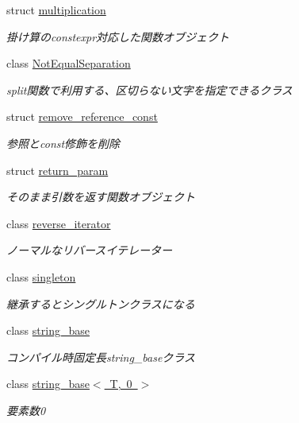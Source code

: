 \begin{DoxyCompactItemize}
struct \mbox{\hyperlink{structsaki_1_1multiplication}{multiplication}}
\begin{DoxyCompactList}\small\item\em 掛け算のconstexpr対応した関数オブジェクト \end{DoxyCompactList}\item 
class \mbox{\hyperlink{classsaki_1_1_not_equal_separation}{Not\+Equal\+Separation}}
\begin{DoxyCompactList}\small\item\em split関数で利用する、区切らない文字を指定できるクラス \end{DoxyCompactList}\item 
struct \mbox{\hyperlink{structsaki_1_1remove__reference__const}{remove\+\_\+reference\+\_\+const}}
\begin{DoxyCompactList}\small\item\em 参照とconst修飾を削除 \end{DoxyCompactList}\item 
struct \mbox{\hyperlink{structsaki_1_1return__param}{return\+\_\+param}}
\begin{DoxyCompactList}\small\item\em そのまま引数を返す関数オブジェクト \end{DoxyCompactList}\item 
class \mbox{\hyperlink{classsaki_1_1reverse__iterator}{reverse\+\_\+iterator}}
\begin{DoxyCompactList}\small\item\em ノーマルなリバースイテレーター \end{DoxyCompactList}\item 
class \mbox{\hyperlink{classsaki_1_1singleton}{singleton}}
\begin{DoxyCompactList}\small\item\em 継承するとシングルトンクラスになる \end{DoxyCompactList}\item 
class \mbox{\hyperlink{classsaki_1_1string__base}{string\+\_\+base}}
\begin{DoxyCompactList}\small\item\em コンパイル時固定長string\+\_\+baseクラス \end{DoxyCompactList}\item 
class \mbox{\hyperlink{classsaki_1_1string__base_3_01_t_00_010_01_4}{string\+\_\+base$<$ T, 0 $>$}}
\begin{DoxyCompactList}\small\item\em 要素数0 \end{DoxyCompactList}\item 

\end{DoxyCompactItemize}

